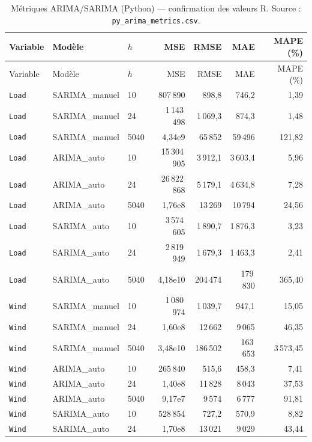 {\small
\begin{longtable}{lllrrrr}
\caption{Métriques ARIMA/SARIMA (Python) --- confirmation des valeurs R.
Source : \texttt{py\_arima\_metrics.csv}.}
\label{tab:arima_metrics_py}\\
\toprule
Variable & Modèle & $h$ & MSE & RMSE & MAE & MAPE (\%) \\
\midrule
\endfirsthead
\toprule
Variable & Modèle & $h$ & MSE & RMSE & MAE & MAPE (\%) \\
\midrule
\endhead
\bottomrule
\endlastfoot
\texttt{Load} & SARIMA\_manuel & 10 & 807\,890 & 898{,}8 & 746{,}2 & 1{,}39 \\
\texttt{Load} & SARIMA\_manuel & 24 & 1\,143\,498 & 1\,069{,}3 & 874{,}3 & 1{,}48 \\
\texttt{Load} & SARIMA\_manuel & 5040 & 4{,}34e9 & 65\,852 & 59\,496 & 121{,}82 \\
\texttt{Load} & ARIMA\_auto & 10 & 15\,304\,905 & 3\,912{,}1 & 3\,603{,}4 & 5{,}96 \\
\texttt{Load} & ARIMA\_auto & 24 & 26\,822\,868 & 5\,179{,}1 & 4\,634{,}8 & 7{,}28 \\
\texttt{Load} & ARIMA\_auto & 5040 & 1{,}76e8 & 13\,269 & 10\,794 & 24{,}56 \\
\texttt{Load} & SARIMA\_auto & 10 & 3\,574\,605 & 1\,890{,}7 & 1\,876{,}3 & 3{,}23 \\
\texttt{Load} & SARIMA\_auto & 24 & 2\,819\,949 & 1\,679{,}3 & 1\,463{,}3 & 2{,}41 \\
\texttt{Load} & SARIMA\_auto & 5040 & 4{,}18e10 & 204\,474 & 179\,830 & 365{,}40 \\
\texttt{Wind} & SARIMA\_manuel & 10 & 1\,080\,974 & 1\,039{,}7 & 947{,}1 & 15{,}05 \\
\texttt{Wind} & SARIMA\_manuel & 24 & 1{,}60e8 & 12\,662 & 9\,065 & 46{,}35 \\
\texttt{Wind} & SARIMA\_manuel & 5040 & 3{,}48e10 & 186\,502 & 163\,653 & 3\,573{,}45 \\
\texttt{Wind} & ARIMA\_auto & 10 & 265\,840 & 515{,}6 & 458{,}3 & 7{,}41 \\
\texttt{Wind} & ARIMA\_auto & 24 & 1{,}40e8 & 11\,828 & 8\,043 & 37{,}53 \\
\texttt{Wind} & ARIMA\_auto & 5040 & 9{,}17e7 & 9\,574 & 6\,777 & 91{,}81 \\
\texttt{Wind} & SARIMA\_auto & 10 & 528\,854 & 727{,}2 & 570{,}9 & 8{,}82 \\
\texttt{Wind} & SARIMA\_auto & 24 & 1{,}70e8 & 13\,021 & 9\,029 & 43{,}44 \\

\end{longtable}}
